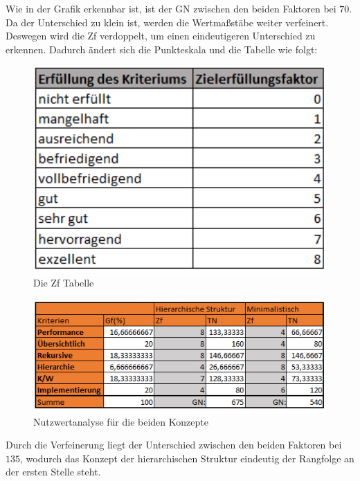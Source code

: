 Wie in der Grafik erkennbar ist, ist der \ac{GN} zwischen den beiden Faktoren bei $70$.
Da der Unterschied zu klein ist, werden die Wertmaßstäbe weiter verfeinert.
Deswegen wird die \ac{Zf} verdoppelt, um einen eindeutigeren Unterschied zu erkennen.
Dadurch ändert sich die Punkteskala und die Tabelle wie folgt:
\begin{figure}[h!]
 \centering
 \includegraphics[width=1\textwidth]{gfx/Picture/Ziel2.PNG}
 \caption{Die Zf Tabelle}
 \label{fig:Ziel}
\end{figure}
\newpage
\begin{figure}[h!]
 \centering
 \includegraphics[width=1\textwidth]{gfx/Picture/Nutzwert2.PNG}
 \caption{Nutzwertanalyse für die beiden Konzepte}
 \label{fig:Nutz}
\end{figure}
Durch die Verfeinerung liegt der Unterschied zwischen den beiden Faktoren bei $135$, wodurch das Konzept der hierarchischen Struktur eindeutig der Rangfolge an der ersten Stelle steht.

